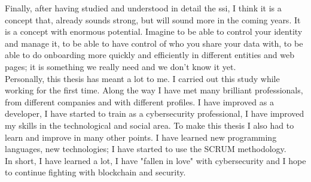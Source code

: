     Finally, after having studied and understood in detail the \acrlong{ssi}, I think it is a concept that, already sounds strong, but will sound more in the coming years. It is a concept with enormous potential. Imagine to be able to control your identity and manage it, to be able to have control of who you share your data with, to be able to do onboarding more quickly and efficiently in different entities and web pages; it is something we really need and we don't know it yet.\\
    
    Personally, this thesis has meant a lot to me. I carried out this study while working for the first time. Along the way I have met many brilliant professionals, from different companies and with different profiles. I have improved as a developer, I have started to train as a cybersecurity professional, I have improved my skills in the technological and social area. To make this thesis I also had to learn and improve in many other points. I have learned new programming languages, new technologies; I have started to use the SCRUM methodology.\\
    
    In short, I have learned a lot, I have "fallen in love" with cybersecurity and I hope to continue fighting with blockchain and security.
